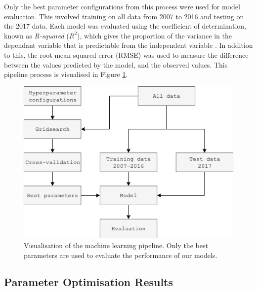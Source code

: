 \documentclass[11pt,conference]{IEEEtran}
\begin{document}
Only the best parameter configurations from this process were used for model evaluation. This involved training on all data from 2007 to 2016 and testing on the 2017 data. Each model was evaluated using the coefficient of determination, known as \textit{R-squared} ($R^2$), which gives the proportion of the variance in the dependant variable that is predictable from the independent variable \cite{cameron1997r}. In addition to this, the root mean squared error (RMSE) was used to measure the difference between the values predicted by the model, and the observed values. This pipeline process is visualised in Figure \ref{fig:mlpipeline}.

\begin{figure}[htbp]
	\begin{center}
    	\includegraphics[width=\linewidth]{figures/ml_pipeline.png}
	\caption{Visualisation of the machine learning pipeline. Only the best parameters are used to evaluate the performance of our models. }
	\label{fig:mlpipeline}
	\end{center}
\end{figure}

\subsection{Parameter Optimisation Results}
\end{document}
